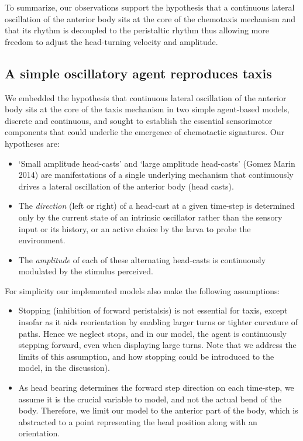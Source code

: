 \documentclass[11pt,a4paper]{article}
\begin{document}
To summarize, our observations support the hypothesis that a continuous lateral oscillation of the anterior body sits at the core of the chemotaxis mechanism and that its rhythm is decoupled to the peristaltic rhythm thus allowing more freedom to adjust the head-turning velocity and amplitude.


\subsection{A simple oscillatory agent reproduces taxis}
We embedded the hypothesis that continuous lateral oscillation of the anterior body sits at the core of the taxis mechanism in two simple agent-based models, discrete and continuous, and sought to establish the essential sensorimotor components that could underlie the emergence of chemotactic signatures. Our hypotheses are:

\begin{itemize}

\item ‘Small amplitude head-casts’ and ‘large amplitude head-casts’ (Gomez Marin 2014) are manifestations of a single underlying mechanism that continuously drives a lateral oscillation of the anterior body (head casts). 

\item The {\it direction} (left or right) of a head-cast at a given time-step is determined only by the current state of an intrinsic oscillator rather than the sensory input or its history, or an active choice by the larva to probe the environment.

\item The {\it amplitude} of each of these alternating head-casts is continuously modulated by the stimulus perceived.

\end{itemize}

For simplicity our implemented models also make the following assumptions:

\begin{itemize}

\item Stopping (inhibition of forward peristalsis) is not essential for taxis, except insofar as it aids reorientation by enabling larger turns or tighter curvature of paths. Hence we neglect stops, and in our model, the agent is continuously stepping forward, even when displaying large turns. Note that we address the limits of this assumption, and how stopping could be introduced to the model, in the discussion).

\item As head bearing determines the forward step direction on each time-step, we assume it is the crucial variable to model, and not the actual bend of the body. Therefore, we limit our model to the anterior part of the body, which is abstracted to a point representing the head position along with an orientation. 

\end{itemize}
\end{document}
